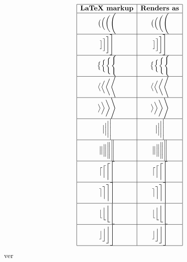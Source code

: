 \documentclass[12pt,letterpaper]{article}
\begin{document}
\[
\begin{array}{|c|c|}
	\hline
	\textbf{LaTeX markup} & \textbf{Renders as} \\
	\hline
	\bigl( \Bigl( \biggl( \Biggl( & 
	\bigl( \Bigl( \biggl( \Biggl( \\
	\hline
	\bigr] \Bigr] \biggr] \Biggr] & 
	\bigr] \Bigr] \biggr] \Biggr] \\
	\hline
	\bigl\{ \Bigl\{ \biggl\{ \Biggl\{ & 
	\bigl\{ \Bigl\{ \biggl\{ \Biggl\{ \\
	\hline
	\bigl \langle \Bigl \langle \biggl \langle \Biggl \langle & 
	\bigl \langle \Bigl \langle \biggl \langle \Biggl \langle \\
	\hline
	\bigr \rangle \Bigr \rangle \biggr \rangle \Biggr \rangle & 
	\bigr \rangle \Bigr \rangle \biggr \rangle \Biggr \rangle \\
	\hline
	\big| \Big| \bigg| \Bigg| & 
	\big| \Big| \bigg| \Bigg| \\
	\hline
	\big\| \Big\| \bigg\| \Bigg\| & 
	\big\| \Big\| \bigg\| \Bigg\| \\
	\hline
	\bigl \lceil \Bigl \lceil \biggl \lceil \Biggl \lceil & 
	\bigl \lceil \Bigl \lceil \biggl \lceil \Biggl \lceil \\
	\hline
	\bigr \rceil \Bigr \rceil \biggr \rceil \Biggr \rceil & 
	\bigr \rceil \Bigr \rceil \biggr \rceil \Biggr \rceil \\
	\hline
	\bigl \lfloor \Bigl \lfloor \biggl \lfloor \Biggl \lfloor & 
	\bigl \lfloor \Bigl \lfloor \biggl \lfloor \Biggl \lfloor \\
	\hline
	\bigr \rfloor \Bigr \rfloor \biggr \rfloor \Biggr \rfloor & 
	\bigr \rfloor \Bigr \rfloor \biggr \rfloor \Biggr \rfloor \\
	\hline
\end{array}
\]ver
	
\end{document}
